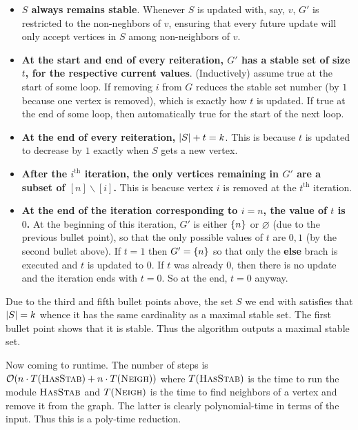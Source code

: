 \begin{enumerate}[leftmargin=*]
\begin{itemize}
\item \textbf{$S$ always remains stable}. Whenever $S$ is updated with, say, $v$, $G'$ is restricted to the non-neghbors of $v$, ensuring that every future update will only accept vertices in $S$ among non-neighbors of $v$. 
\item \textbf{At the start and end of every reiteration, $G'$ has a stable set of size $t$, for the respective current values}. (Inductively) assume true at the start of some loop. If removing $i$ from $G$ reduces the stable set number (by $1$ because one vertex is removed), which is exactly how $t$ is updated. If true at the end of some loop, then automatically true for the start of the next loop.
\item \textbf{At the end of every reiteration, $\left| S \right| +t = k$}. This is because $t$ is updated to decrease by $1$ exactly when $S$ gets a new vertex.
\item \textbf{After the $i^{\text{th}}$ iteration, the only vertices remaining in $G'$ are a subset of $[n]\smallsetminus[i]$.} This is beacuse vertex $i$ is removed at the $t^{\text{th}}$ iteration.
\item \textbf{At the end of the iteration corresponding to $i=n$, the value of $t$ is $0$.} At the beginning of this iteration, $G'$ is either $\left\{n\right\}$ or $\varnothing$ (due to the previous bullet point), so that the only possible values of $t$ are $0,1$ (by the second bullet above). If $t=1$ then $G'=\left\{n\right\}$ so that only the \textbf{else} brach is executed and $t$ is updated to $0$. If $t$ was already $0$, then there is no update and the iteration ends with $t=0$. So at the end, $t=0$ anyway.
\end{itemize}

Due to the third and fifth bullet points above, the set $S$ we end with satisfies that $\left| S \right| = k$ whence it has the same cardinality as a maximal stable set. The first bullet point shows that it is stable. Thus the algorithm outputs a maximal stable set.

Now coming to runtime. The number of steps is $\mathcal O(n\cdot T(\textsc{HasStab})+n\cdot T(\textsc{Neigh}))$ where $T(\textsc{HasStab})$ is the time to run the module $\textsc{HasStab}$ and $T(\textsc{Neigh})$ is the time to find neighbors of a vertex and remove it from the graph. The latter is clearly polynomial-time in terms of the input. Thus this is a poly-time reduction.

\end{enumerate}



